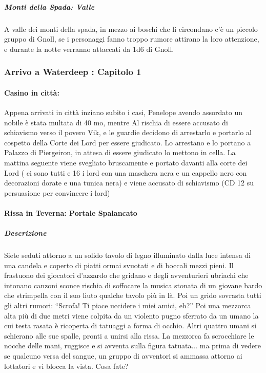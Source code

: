 \documentclass{article}
\begin{document}
                        \subparagraph{Monti della Spada: Valle}
A valle dei monti della spada, in mezzo ai boschi che li circondano c'è un piccolo gruppo di Gnoll, se i personaggi fanno troppo rumore attirano la loro attenzione, e durante la notte verranno attaccati da 1d6 di Gnoll. 
    	   
                        
           
                                \subsubsection{Arrivo a Waterdeep : Capitolo 1}
                \paragraph{Casino in città:} Appena arrivati in città inziano subito i casi, Penelope avendo assordato un nobile è stata multata di 40 mo, mentre Al rischia di essere accusato di schiavismo verso il povero Vik, e le guardie decidono di arrestarlo e portarlo al cospetto della Corte dei Lord per essere giudicato. Lo arrestano e lo portano a Palazzo di Piergeiron, in attesa di essere giudicato lo mettono in cella. La mattina seguente viene svegliato bruscamente e portato davanti alla corte dei Lord ( ci sono tutti e 16 i lord con una maschera nera e un cappello nero con decorazioni dorate e una tunica nera)
                                        e viene accusato di schiavismo (CD 12 su persuasione per convincere i lord)
                \paragraph{Rissa in Teverna: Portale Spalancato}

                        \subparagraph{Descrizione}Siete seduti attorno a un solido tavolo di legno illuminato
dalla luce intensa di una candela e coperto di piatti
ormai svuotati e di boccali mezzi pieni. Il frastuono
dei giocatori d'azzardo che gridano e degli avventurieri
ubriachi che intonano canzoni sconce rischia di soffocare
la musica stonata di un giovane bardo che strimpella con
il suo liuto qualche tavolo più in là.
Poi un grido sovrasta tutti gli altri rumori: “Scrofa! Ti
piace uccidere i miei amici, eh?” Poi una mezzorca alta più
di due metri viene colpita da un violento pugno sferrato
da un umano la cui testa rasata è ricoperta di tatuaggi
a forma di occhio. Altri quattro umani si schierano alle
sue spalle, pronti a unirsi alla rissa. La mezzorca fa
scrocchiare le nocche delle mani, ruggisce e si avventa
sulla figura tatuata... ma prima di vedere se qualcuno
versa del sangue, un gruppo di avventori si ammassa
attorno ai lottatori e vi blocca la vista. Cosa fate?
\end{document}
